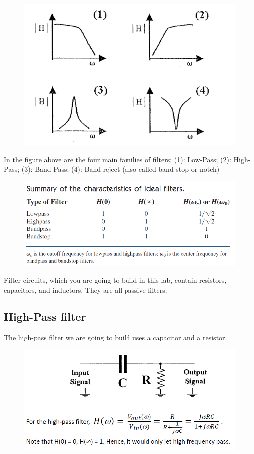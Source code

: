 \documentclass{article}
\begin{document}
\begin{figure}[!h]
	\centering
	\includegraphics[width=12cm]{1.png}
	\label{fig-1}
\end{figure}

In the figure above are the four main families of filters:
(1): Low-Pass; (2): High-Pass; (3): Band-Pass; (4): Band-reject (also called band-stop or notch)

\begin{figure}[!h]
	\centering
	\includegraphics[width=12cm]{2.png}
	\label{fig-2}
\end{figure}

Filter circuits, which you are going to build in this lab, contain resistors, capacitors, and inductors. They are all passive filters.

\newpage

\subsection{High-Pass filter}

The high-pass filter we are going to build uses a capacitor and a resistor.

\begin{figure}[!h]
	\centering
	\includegraphics[width=12cm]{3.png}
	\label{fig-3}
\end{figure}
\end{document}
